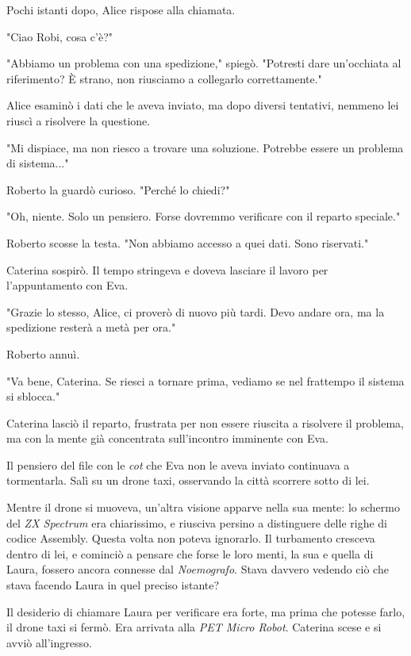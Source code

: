 Pochi istanti dopo, Alice rispose alla chiamata.

"Ciao Robi, cosa c'è?"

"Abbiamo un problema con una spedizione," spiegò. "Potresti dare un'occhiata al riferimento? È strano, non riusciamo a collegarlo correttamente."

Alice esaminò i dati che le aveva inviato, ma dopo diversi tentativi, nemmeno lei riuscì a risolvere la questione.

"Mi dispiace, ma non riesco a trovare una soluzione. Potrebbe essere un problema di sistema..."


Roberto la guardò curioso. "Perché lo chiedi?"

"Oh, niente. Solo un pensiero. Forse dovremmo verificare con il reparto speciale."

Roberto scosse la testa. "Non abbiamo accesso a quei dati. Sono riservati."

Caterina sospirò. Il tempo stringeva e doveva lasciare il lavoro per l'appuntamento con Eva.

"Grazie lo stesso, Alice, ci proverò di nuovo più tardi. Devo andare ora, ma la spedizione resterà a metà per ora."

Roberto annuì.

"Va bene, Caterina. Se riesci a tornare prima, vediamo se nel frattempo il sistema si sblocca."

Caterina lasciò il reparto, frustrata per non essere riuscita a risolvere il problema, ma con la mente già concentrata sull'incontro imminente con Eva.

Il pensiero del file con le \emph{cot} che Eva non le aveva inviato continuava a tormentarla. Salì su un drone taxi, osservando la città scorrere sotto di lei.

Mentre il drone si muoveva, un'altra visione apparve nella sua mente: lo schermo del \emph{ZX Spectrum} era chiarissimo, e riusciva persino a distinguere delle righe di codice Assembly. Questa volta non poteva ignorarlo. Il turbamento cresceva dentro di lei, e cominciò a pensare che forse le loro menti, la sua e quella di Laura, fossero ancora connesse dal \emph{Noemografo}. Stava davvero vedendo ciò che stava facendo Laura in quel preciso istante?

Il desiderio di chiamare Laura per verificare era forte, ma prima che potesse farlo, il drone taxi si fermò. Era arrivata alla \emph{PET Micro Robot}. Caterina scese e si avviò all'ingresso.

